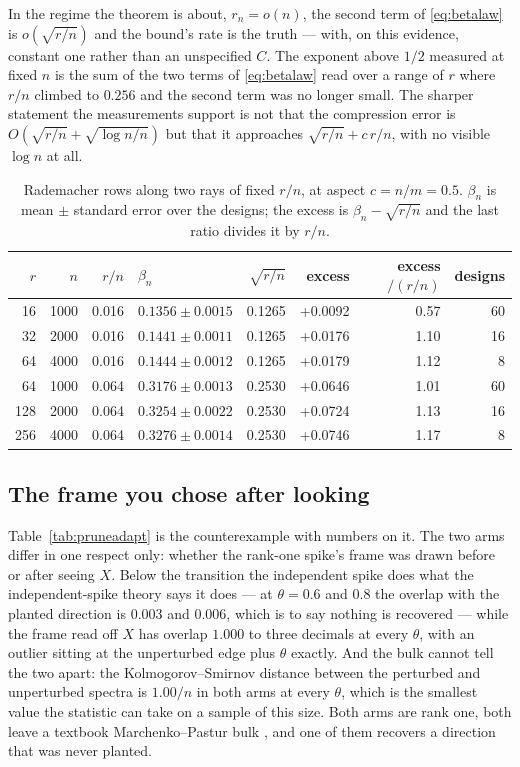 \documentclass[11pt]{article}
\theoremstyle{definition}
\begin{document}
In the regime the theorem is about, $r_n=o(n)$, the second term of \eqref{eq:betalaw} is
$o(\sqrt{r/n})$ and the bound's rate is the truth --- with, on this evidence, constant one rather
than an unspecified $C$. The exponent above $1/2$ measured at fixed $n$ is the sum of the two terms of
\eqref{eq:betalaw} read over a range of $r$ where $r/n$ climbed to $0.256$ and the second term was
no longer small. The sharper statement the measurements support is not that the compression error is
$O(\sqrt{r/n}+\sqrt{\log n/n})$ but that it approaches $\sqrt{r/n}+c\,r/n$, with no visible $\log n$
at all.

\begin{table}[t]
\centering\small
\caption{Rademacher rows along two rays of fixed $r/n$, at aspect $c=n/m=0.5$. $\beta_n$ is mean
$\pm$ standard error over the designs; the excess is $\beta_n-\sqrt{r/n}$ and the last ratio divides
it by $r/n$.}
\label{tab:ray}
\begin{tabular}{rrrlrrrr}
\toprule
$r$ & $n$ & $r/n$ & $\beta_n$ & $\sqrt{r/n}$ & excess & excess$/(r/n)$ & designs\\
\midrule
16 & 1000 & 0.016 & $0.1356\pm0.0015$ & 0.1265 & +0.0092 & 0.57 & 60\\
32 & 2000 & 0.016 & $0.1441\pm0.0011$ & 0.1265 & +0.0176 & 1.10 & 16\\
64 & 4000 & 0.016 & $0.1444\pm0.0012$ & 0.1265 & +0.0179 & 1.12 & 8\\
64 & 1000 & 0.064 & $0.3176\pm0.0013$ & 0.2530 & +0.0646 & 1.01 & 60\\
128 & 2000 & 0.064 & $0.3254\pm0.0022$ & 0.2530 & +0.0724 & 1.13 & 16\\
256 & 4000 & 0.064 & $0.3276\pm0.0014$ & 0.2530 & +0.0746 & 1.17 & 8\\
\bottomrule
\end{tabular}
\end{table}

\subsection{The frame you chose after looking}

Table~\ref{tab:pruneadapt} is the counterexample with numbers on it. The two arms differ in one
respect only: whether the rank-one spike's frame was drawn before or after seeing $X$. Below the
transition the independent spike does what the independent-spike theory \cite{BGN} says it does ---
at $\theta=0.6$ and $0.8$ the overlap with the planted direction is $0.003$ and $0.006$, which is to
say nothing is recovered --- while the frame read off $X$ has overlap $1.000$ to three decimals at
every $\theta$, with an outlier sitting at the unperturbed edge plus $\theta$ exactly. And the bulk
cannot tell the two apart: the Kolmogorov--Smirnov distance between the perturbed and unperturbed
spectra is $1.00/n$ in both arms at every $\theta$, which is the smallest value the statistic can
take on a sample of this size. Both arms are rank one, both leave a textbook Marchenko--Pastur bulk
\cite{MarchenkoPastur}, and one of them recovers a direction that was never planted.
\end{document}
